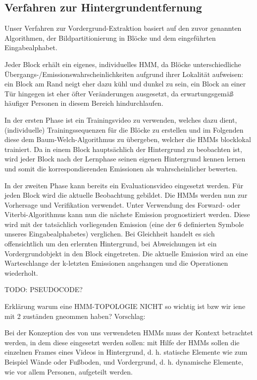 \subsection{Verfahren zur Hintergrundentfernung}

Unser Verfahren zur Vordergrund-Extraktion basiert auf den zuvor genannten  Algorithmen, der Bildpartitionierung in Blöcke und dem eingeführten Eingabealphabet.


Jeder Block erhält ein eigenes, individuelles HMM, da Blöcke unterschiedliche Übergangs-/Emissionswahrscheinlichkeiten aufgrund ihrer Lokalität aufweisen: ein Block am Rand neigt eher dazu kühl und dunkel zu sein, ein Block an einer Tür hingegen ist eher öfter Veränderungen ausgesetzt, da erwartungsgemäß häufiger Personen in diesem Bereich hindurchlaufen.
 

In der ersten Phase ist ein Trainingsvideo zu verwenden, welches dazu dient, (individuelle) Trainingssequenzen für die Blöcke zu erstellen und im Folgenden diese dem Baum-Welch-Algorithmus zu übergeben, welcher die HMMs blocklokal trainiert.
 Da in einem Block hauptsächlich der Hintergrund zu beobachten ist, wird jeder Block nach der Lernphase seinen eigenen Hintergrund kennen lernen und somit die korrespondierenden Emissionen als wahrscheinlicher bewerten.


In der zweiten Phase kann bereits ein Evaluationsvideo eingesetzt werden.
 Für jeden Block wird die aktuelle Beobachtung gebildet.
 Die HMMs werden nun zur Vorhersage und Verifikation verwendet.
 Unter Verwendung des Forward- oder Viterbi-Algorithmus kann nun die nächste Emission prognostiziert werden.
 Diese wird mit der tatsächlich vorliegenden Emission (eine der 6 definierten Symbole unseres Eingabealphabetes) verglichen.
 Bei Gleichheit handelt es sich offensichtlich um den erlernten Hintergrund, bei Abweichungen ist ein Vordergrundobjekt in den Block eingetreten.
 Die aktuelle Emission wird an eine Warteschlange der k-letzten Emissionen angehangen und die Operationen wiederholt.




TODO: PSEUDOCODE?

Erklärung warum eine HMM-TOPOLOGIE NICHT so wichtig ist bzw wir iene mit 2 zuständen gneommen haben? 
Vorschlag:

Bei der Konzeption des von uns verwendeten HMMs muss der Kontext betrachtet werden, in dem diese eingesetzt werden sollen: mit Hilfe der HMMs sollen die einzelnen  Frames eines Videos in Hintergrund, d.
h.
 statische Elemente wie zum Beispiel Wände oder Fußboden, und Vordergrund, d.
h.
 dynamische Elemente, wie vor allem Personen, aufgeteilt werden.

